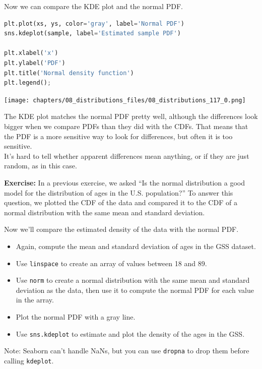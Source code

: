 Now we can compare the KDE plot and the normal PDF.

\begin{lstlisting}[language=Python,style=source]
plt.plot(xs, ys, color='gray', label='Normal PDF')
sns.kdeplot(sample, label='Estimated sample PDF')

plt.xlabel('x')
plt.ylabel('PDF')
plt.title('Normal density function')
plt.legend();
\end{lstlisting}

\begin{center}
\texttt{[image: chapters/08\_distributions\_files/08\_distributions\_117\_0.png]}
\end{center}

The KDE plot matches the normal PDF pretty well, although the
differences look bigger when we compare PDFs than they did with the
CDFs. That means that the PDF is a more sensitive way to look for
differences, but often it is too sensitive.\\
It's hard to tell whether apparent differences mean anything, or if they
are just random, as in this case.

\textbf{Exercise:} In a previous exercise, we asked ``Is the normal
distribution a good model for the distribution of ages in the U.S.
population?'' To answer this question, we plotted the CDF of the data
and compared it to the CDF of a normal distribution with the same mean
and standard deviation.

Now we'll compare the estimated density of the data with the normal PDF.

\begin{itemize}
\item
  Again, compute the mean and standard deviation of ages in the GSS
  dataset.
\item
  Use \passthrough{\lstinline!linspace!} to create an array of values
  between 18 and 89.
\item
  Use \passthrough{\lstinline!norm!} to create a normal distribution
  with the same mean and standard deviation as the data, then use it to
  compute the normal PDF for each value in the array.
\item
  Plot the normal PDF with a gray line.
\item
  Use \passthrough{\lstinline!sns.kdeplot!} to estimate and plot the
  density of the ages in the GSS.
\end{itemize}

Note: Seaborn can't handle NaNs, but you can use
\passthrough{\lstinline!dropna!} to drop them before calling
\passthrough{\lstinline!kdeplot!}.

